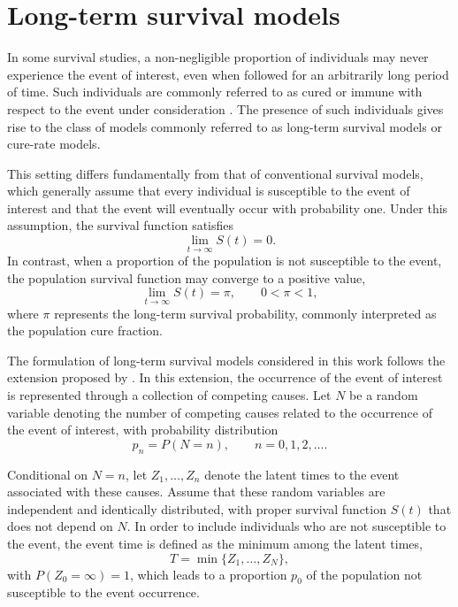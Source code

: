 \section{Long-term survival models}

In some survival studies, a non-negligible proportion of individuals may never experience
the event of interest, even when followed for an arbitrarily long period of time. Such
individuals are commonly referred to as cured or immune with respect to
the event under consideration \cite{maller1996survival}. The presence of such individuals gives
rise to the class of models commonly referred to as long-term survival models or
cure-rate models.

This setting differs fundamentally from that of conventional survival models, which
generally assume that every individual is susceptible to the event of interest and that
the event will eventually occur with probability one. Under this assumption, the
survival function satisfies
\begin{equation}
\lim_{t\rightarrow\infty} S(t)=0.
\end{equation}
In contrast, when a proportion of the population is not susceptible to the event, the
population survival function may converge to a positive value,
\begin{equation}
\lim_{t\rightarrow\infty} S(t)=\pi,
\qquad 0<\pi<1,
\end{equation}
where $\pi$ represents the long-term survival probability, commonly interpreted as the
population cure fraction.

The formulation of long-term survival models considered in this work follows the
extension proposed by .
In this extension, the occurrence of the event of interest is represented through a
collection of competing causes. Let $N$ be a random variable denoting the number of
competing causes related to the occurrence of the event of interest, with probability
distribution
\begin{equation}
\label{eq:N_distribution}
p_n=P(N=n), \qquad n=0,1,2,\ldots.
\end{equation}

Conditional on $N=n$, let $Z_1,\ldots,Z_n$ denote the latent times to the event
associated with these causes. Assume that these random variables are independent and
identically distributed, with proper survival function $S(t)$ that does not depend on
$N$. In order to include individuals who are not susceptible to the event, the event
time is defined as the minimum among the latent times,
\begin{equation}
\label{eq:latent_event_time}
T=\min\{Z_1,\ldots,Z_N\},
\end{equation}
with $P\left(Z_{0} = \infty\right) = 1$, which leads to a proportion $p_0$ of the population
not susceptible to the event occurrence.

